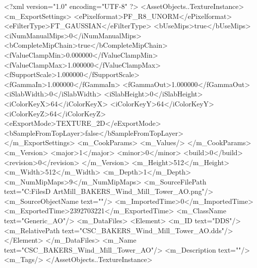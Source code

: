 <?xml version="1.0" encoding="UTF-8" ?>
<AssetObjects..TextureInstance>
	<m_ExportSettings>
		<ePixelformat>PF_R8_UNORM</ePixelformat>
		<eFilterType>FT_GAUSSIAN</eFilterType>
		<bUseMips>true</bUseMips>
		<iNumManualMips>0</iNumManualMips>
		<bCompleteMipChain>true</bCompleteMipChain>
		<fValueClampMin>0.000000</fValueClampMin>
		<fValueClampMax>1.000000</fValueClampMax>
		<fSupportScale>1.000000</fSupportScale>
		<fGammaIn>1.000000</fGammaIn>
		<fGammaOut>1.000000</fGammaOut>
		<iSlabWidth>0</iSlabWidth>
		<iSlabHeight>0</iSlabHeight>
		<iColorKeyX>64</iColorKeyX>
		<iColorKeyY>64</iColorKeyY>
		<iColorKeyZ>64</iColorKeyZ>
		<eExportMode>TEXTURE_2D</eExportMode>
		<bSampleFromTopLayer>false</bSampleFromTopLayer>
	</m_ExportSettings>
	<m_CookParams>
		<m_Values/>
	</m_CookParams>
	<m_Version>
		<major>1</major>
		<minor>0</minor>
		<build>0</build>
		<revision>0</revision>
	</m_Version>
	<m_Height>512</m_Height>
	<m_Width>512</m_Width>
	<m_Depth>1</m_Depth>
	<m_NumMipMaps>9</m_NumMipMaps>
	<m_SourceFilePath text="C:\Users\Shadow\Desktop\Working Files\3D Art\BAKERS\Wind Mill\tower\CSC_BAKERS_Wind_Mill_Tower_AO.png"/>
	<m_SourceObjectName text=""/>
	<m_ImportedTime>0</m_ImportedTime>
	<m_ExportedTime>2392703221</m_ExportedTime>
	<m_ClassName text="Generic_AO"/>
	<m_DataFiles>
		<Element>
			<m_ID text="DDS"/>
			<m_RelativePath text="CSC_BAKERS_Wind_Mill_Tower_AO.dds"/>
		</Element>
	</m_DataFiles>
	<m_Name text="CSC_BAKERS_Wind_Mill_Tower_AO"/>
	<m_Description text=""/>
	<m_Tags/>
</AssetObjects..TextureInstance>

